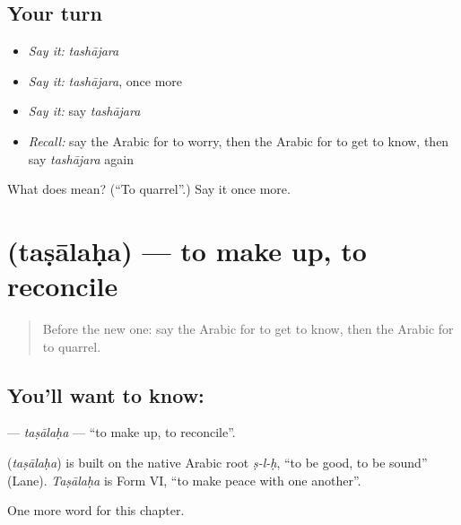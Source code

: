 \subsection*{Your turn}
\begin{itemize}
\raggedright
  \item \emph{Say it:} \emph{tashājara}
  \item \emph{Say it:} \emph{tashājara}, once more
  \item \emph{Say it:} say \emph{tashājara}
  \item \emph{Recall:} say the Arabic for to worry, then the Arabic for to get to know, then say \emph{tashājara} again
\end{itemize}

\begin{tcolorbox}[breakable,colback=teal!4,colframe=teal!35!black,title={Before you move on}]
What does  mean? (\textquotedblleft{}To quarrel\textquotedblright{}.) Say it once more.
\end{tcolorbox}
\section[\texorpdfstring{\ar{تصالح} (taṣālaḥa)}{تصالح (taṣālaḥa)}]{ (taṣālaḥa) — to make up, to reconcile}

\label{lesson:AR-C227-tasalaha}



\begin{quote}
Before the new one: say the Arabic for to get to know, then the Arabic for to quarrel.
\end{quote}

\subsection*{You'll want to know: }
\textbf{} — \emph{taṣālaḥa} — \textquotedblleft{}to make up, to reconcile\textquotedblright{}.

\begin{cousinweb}
\textbf{} (\emph{taṣālaḥa}) is built on the native Arabic root \emph{ṣ-l-ḥ}, \textquotedblleft{}to be good, to be sound\textquotedblright{} (Lane). \emph{Taṣālaḥa} is Form VI, \textquotedblleft{}to make peace with one another\textquotedblright{}.
\end{cousinweb}

\begin{grammarlens}[title={What you've built}]
One more word for this chapter.
\end{grammarlens}

